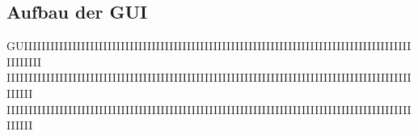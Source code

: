 \subsection{Aufbau der GUI}

GUIIIIIIIIIIIIIIIIIIIIIIIIIIIIIIIIIIIIIIIIIIIIIIIIIIIIIIIIIIIIIIIIIIIIIIIIIIIIIIIIIIIIIIIIIIIIIIII
IIIIIIIIIIIIIIIIIIIIIIIIIIIIIIIIIIIIIIIIIIIIIIIIIIIIIIIIIIIIIIIIIIIIIIIIIIIIIIIIIIIIIIIIIIIIIIIIII
IIIIIIIIIIIIIIIIIIIIIIIIIIIIIIIIIIIIIIIIIIIIIIIIIIIIIIIIIIIIIIIIIIIIIIIIIIIIIIIIIIIIIIIIIIIIIIIIII
